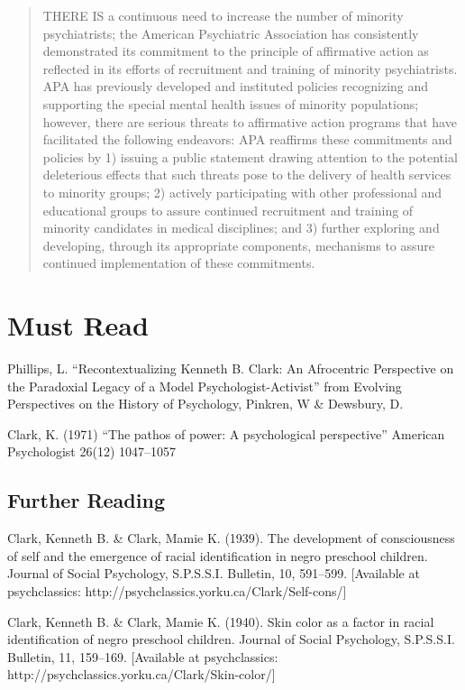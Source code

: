 \begin{refsection}
\begin{quote}
THERE IS a continuous need to increase the number of minority psychiatrists; the American Psychiatric Association has consistently demonstrated its commitment to the principle of affirmative action as reflected in its efforts of recruitment and training of minority psychiatrists. APA has previously developed and instituted policies recognizing and supporting the special mental health issues of minority populations; however, there are serious threats to affirmative action programs that have facilitated the following endeavors: APA reaffirms these commitments and policies by 1) issuing a public statement drawing attention to the potential deleterious effects that such threats pose to the delivery of health services to minority groups; 2) actively participating with other professional and educational groups to assure continued recruitment and training of minority candidates in medical disciplines; and 3) further exploring and developing, through its appropriate components, mechanisms to assure continued implementation of these commitments.
\end{quote}

\section{Must Read}
\label{mustread}

Phillips, L. ``Recontextualizing Kenneth B. Clark: An Afrocentric Perspective on the Paradoxial Legacy of a Model Psychologist-Activist'' from Evolving Perspectives on the History of Psychology, Pinkren, W \& Dewsbury, D.

Clark, K. (1971) ``The pathos of power: A psychological perspective'' American Psychologist 26(12) 1047--1057

\subsection{Further Reading}
\label{furtherreading}

Clark, Kenneth B. \& Clark, Mamie K. (1939). The development of consciousness of self and the emergence of racial identification in negro preschool children. Journal of Social Psychology, S.P.S.S.I. Bulletin, 10, 591--599. [Available at psychclassics: http:\slash \slash psychclassics.yorku.ca\slash Clark\slash Self-cons\slash ]

Clark, Kenneth B. \& Clark, Mamie K. (1940). Skin color as a factor in racial identification of negro preschool children. Journal of Social Psychology, S.P.S.S.I. Bulletin, 11, 159--169. [Available at psychclassics: http:\slash \slash psychclassics.yorku.ca\slash Clark\slash Skin-color\slash ]


\end{refsection}
